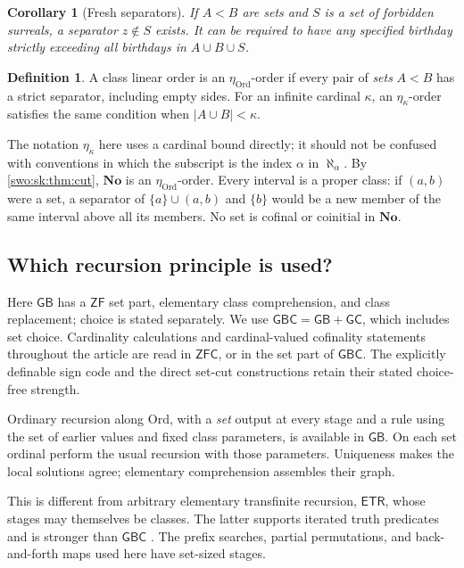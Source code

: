 \documentclass[11pt]{article}
\newtheorem{corollary}[corollary]{Corollary}
\theoremstyle{definition}
\newtheorem{definition}[definition]{Definition}
\theoremstyle{remark}
\newcommand{\No}{\mathbf{No}}
\newcommand{\Ord}{\mathrm{Ord}}
\newcommand{\GB}{\mathsf{GB}}
\newcommand{\GBC}{\mathsf{GBC}}
\newcommand{\ZFC}{\mathsf{ZFC}}
\newcommand{\ZF}{\mathsf{ZF}}
\newcommand{\ETR}{\mathsf{ETR}}
\newcommand{\GC}{\mathsf{GC}}
\begin{document}
\begin{corollary}[Fresh separators]\label{swo:sk:cor:fresh}
If $A<B$ are sets and $S$ is a set of forbidden surreals, a separator
$z\notin S$ exists. It can be required to have any specified birthday
strictly exceeding all birthdays in $A\cup B\cup S$.
\end{corollary}

\begin{definition}\label{swo:sk:def:eta}
A class linear order is an $\eta_{\Ord}$-order if every pair of
\emph{sets} $A<B$ has a strict separator, including empty sides. For an
infinite cardinal $\kappa$, an $\eta_\kappa$-order satisfies the same
condition when $|A\cup B|<\kappa$.
\end{definition}

The notation $\eta_\kappa$ here uses a cardinal bound directly; it should
not be confused with conventions in which the subscript is the index
$\alpha$ in $\aleph_\alpha$. By \cref{swo:sk:thm:cut}, $\No$ is an
$\eta_{\Ord}$-order. Every interval is a proper class: if $(a,b)$ were a
set, a separator of $\{a\}\cup(a,b)$ and $\{b\}$ would be a new member
of the same interval above all its members. No set is cofinal or
coinitial in $\No$.

\subsection{Which recursion principle is used?}

Here \(\GB\) has a \(\ZF\) set part, elementary class comprehension,
and class replacement; choice is stated separately.
We use \(\GBC=\GB+\GC\), which includes set choice.
Cardinality calculations and cardinal-valued cofinality statements
throughout the article are read in \(\ZFC\), or in the set part of
\(\GBC\). The explicitly definable sign code and the direct
set-cut constructions retain their stated choice-free strength.

Ordinary recursion along \(\Ord\), with a \emph{set} output at every
stage and a rule using the set of earlier values and fixed class
parameters, is available in \(\GB\). On each set ordinal perform the
usual recursion with those parameters. Uniqueness makes the local
solutions agree; elementary comprehension assembles their graph.

This is different from arbitrary elementary transfinite recursion,
\(\ETR\), whose stages may themselves be classes. The latter supports
iterated truth predicates and is stronger than \(\GBC\)
\cite{GitmanHamkins}. The prefix searches, partial permutations, and
back-and-forth maps used here have set-sized stages.
\end{document}
